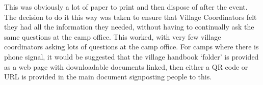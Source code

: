 This was obviously a lot of paper to print and then dispose of after the event. The decision to do it this way was taken to ensure that Village Coordinators felt they had all the information they needed, without having to continually ask the same questions at the camp office. This worked, with very few village coordinators asking lots of questions at the camp office. For camps where there is phone signal, it would be suggested that the village handbook `folder' is provided as a web page with downloadable documents linked, then either a QR code or URL is provided in the main document signposting people to this.